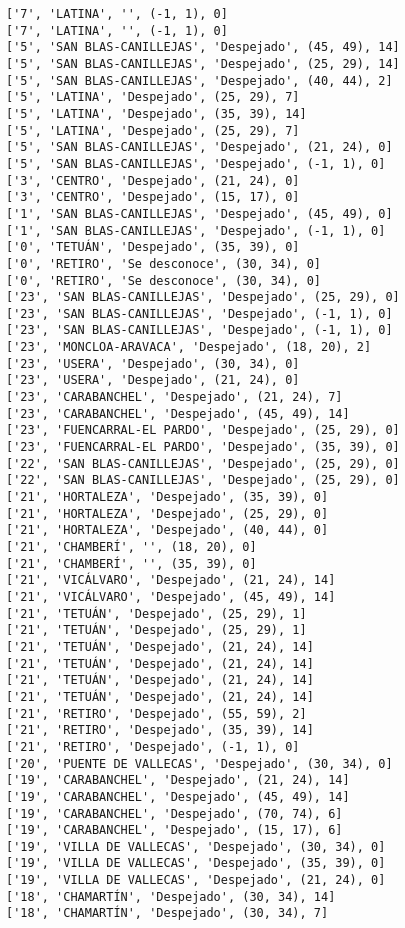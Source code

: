 \documentclass[11pt]{article}
\begin{document}
\begin{Verbatim}[commandchars=\\\{\}]
['7', 'LATINA', '', (-1, 1), 0]
['7', 'LATINA', '', (-1, 1), 0]
['5', 'SAN BLAS-CANILLEJAS', 'Despejado', (45, 49), 14]
['5', 'SAN BLAS-CANILLEJAS', 'Despejado', (25, 29), 14]
['5', 'SAN BLAS-CANILLEJAS', 'Despejado', (40, 44), 2]
['5', 'LATINA', 'Despejado', (25, 29), 7]
['5', 'LATINA', 'Despejado', (35, 39), 14]
['5', 'LATINA', 'Despejado', (25, 29), 7]
['5', 'SAN BLAS-CANILLEJAS', 'Despejado', (21, 24), 0]
['5', 'SAN BLAS-CANILLEJAS', 'Despejado', (-1, 1), 0]
['3', 'CENTRO', 'Despejado', (21, 24), 0]
['3', 'CENTRO', 'Despejado', (15, 17), 0]
['1', 'SAN BLAS-CANILLEJAS', 'Despejado', (45, 49), 0]
['1', 'SAN BLAS-CANILLEJAS', 'Despejado', (-1, 1), 0]
['0', 'TETUÁN', 'Despejado', (35, 39), 0]
['0', 'RETIRO', 'Se desconoce', (30, 34), 0]
['0', 'RETIRO', 'Se desconoce', (30, 34), 0]
['23', 'SAN BLAS-CANILLEJAS', 'Despejado', (25, 29), 0]
['23', 'SAN BLAS-CANILLEJAS', 'Despejado', (-1, 1), 0]
['23', 'SAN BLAS-CANILLEJAS', 'Despejado', (-1, 1), 0]
['23', 'MONCLOA-ARAVACA', 'Despejado', (18, 20), 2]
['23', 'USERA', 'Despejado', (30, 34), 0]
['23', 'USERA', 'Despejado', (21, 24), 0]
['23', 'CARABANCHEL', 'Despejado', (21, 24), 7]
['23', 'CARABANCHEL', 'Despejado', (45, 49), 14]
['23', 'FUENCARRAL-EL PARDO', 'Despejado', (25, 29), 0]
['23', 'FUENCARRAL-EL PARDO', 'Despejado', (35, 39), 0]
['22', 'SAN BLAS-CANILLEJAS', 'Despejado', (25, 29), 0]
['22', 'SAN BLAS-CANILLEJAS', 'Despejado', (25, 29), 0]
['21', 'HORTALEZA', 'Despejado', (35, 39), 0]
['21', 'HORTALEZA', 'Despejado', (25, 29), 0]
['21', 'HORTALEZA', 'Despejado', (40, 44), 0]
['21', 'CHAMBERÍ', '', (18, 20), 0]
['21', 'CHAMBERÍ', '', (35, 39), 0]
['21', 'VICÁLVARO', 'Despejado', (21, 24), 14]
['21', 'VICÁLVARO', 'Despejado', (45, 49), 14]
['21', 'TETUÁN', 'Despejado', (25, 29), 1]
['21', 'TETUÁN', 'Despejado', (25, 29), 1]
['21', 'TETUÁN', 'Despejado', (21, 24), 14]
['21', 'TETUÁN', 'Despejado', (21, 24), 14]
['21', 'TETUÁN', 'Despejado', (21, 24), 14]
['21', 'TETUÁN', 'Despejado', (21, 24), 14]
['21', 'RETIRO', 'Despejado', (55, 59), 2]
['21', 'RETIRO', 'Despejado', (35, 39), 14]
['21', 'RETIRO', 'Despejado', (-1, 1), 0]
['20', 'PUENTE DE VALLECAS', 'Despejado', (30, 34), 0]
['19', 'CARABANCHEL', 'Despejado', (21, 24), 14]
['19', 'CARABANCHEL', 'Despejado', (45, 49), 14]
['19', 'CARABANCHEL', 'Despejado', (70, 74), 6]
['19', 'CARABANCHEL', 'Despejado', (15, 17), 6]
['19', 'VILLA DE VALLECAS', 'Despejado', (30, 34), 0]
['19', 'VILLA DE VALLECAS', 'Despejado', (35, 39), 0]
['19', 'VILLA DE VALLECAS', 'Despejado', (21, 24), 0]
['18', 'CHAMARTÍN', 'Despejado', (30, 34), 14]
['18', 'CHAMARTÍN', 'Despejado', (30, 34), 7]

\end{Verbatim}
\end{document}
